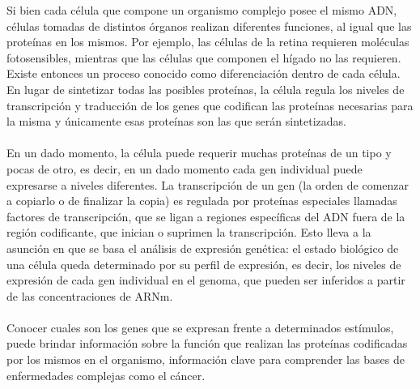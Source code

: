 Si bien cada célula que compone un organismo complejo posee el mismo ADN, células tomadas de distintos órganos realizan diferentes funciones, al igual que las proteínas en los mismos. Por ejemplo, las células de la retina requieren moléculas fotosensibles, mientras que las células que componen el hígado no las requieren. Existe entonces un proceso conocido como diferenciación dentro de cada célula. En lugar de sintetizar todas las posibles proteínas, la célula regula los niveles de transcripción y traducción de los genes que codifican las proteínas necesarias para la misma y únicamente esas proteínas son las que serán sintetizadas.\\\\
En un dado momento, la célula puede requerir muchas proteínas de un tipo y pocas de otro, es decir, en un dado momento cada gen individual puede expresarse a niveles diferentes. La transcripción de un gen (la orden de comenzar a copiarlo o de finalizar la copia) es regulada por proteínas especiales llamadas factores de transcripción, que se ligan a regiones específicas del ADN fuera de la región codificante, que inician o suprimen la transcripción. Esto lleva a la asunción en que se basa el análisis de expresión genética: el estado biológico de una célula queda determinado por su perfil de expresión, es decir, los niveles de expresión de cada gen individual en el genoma, que pueden ser inferidos a partir de las concentraciones de ARNm.\\\\
Conocer cuales son los genes que se expresan frente a determinados estímulos, puede brindar información sobre la función que realizan las proteínas codificadas por los mismos en el organismo, información clave para comprender las bases de enfermedades complejas como el cáncer.